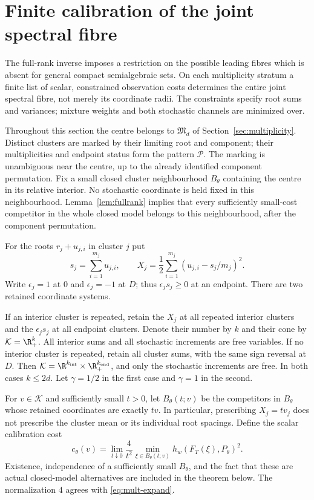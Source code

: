 \section{Finite calibration of the joint spectral fibre}\label{sec:v101-finite}
The full-rank inverse imposes a restriction on the possible leading
fibres which is absent for general compact semialgebraic sets. On each
multiplicity stratum a finite list of scalar, constrained observation
costs determines the entire joint spectral fibre, not merely its
coordinate radii. The constraints specify root sums and variances;
mixture weights and both stochastic channels are minimized over.

Throughout this section the centre belongs to $\mathfrak M_d$ of
Section~\ref{sec:multiplicity}. Distinct clusters are marked by their
limiting root and component; their multiplicities and endpoint status
form the pattern $\mathcal P$. The marking is unambiguous near the
centre, up to the already identified component permutation. Fix a small
closed cluster neighbourhood $B_\theta$ containing the centre in its
relative interior. No stochastic coordinate is held fixed in this
neighbourhood. Lemma~\ref{lem:fullrank} implies that every sufficiently
small-cost competitor in the whole closed model belongs to this
neighbourhood, after the component permutation.

For the roots $r_j+u_{j,i}$ in cluster $j$ put
\[
 s_j=\sum_{i=1}^{m_j}u_{j,i},\qquad
 X_j=\frac12\sum_{i=1}^{m_j}(u_{j,i}-s_j/m_j)^2.
\]
Write $\epsilon_j=1$ at $0$ and $\epsilon_j=-1$ at $D$; thus
$\epsilon_j s_j\ge0$ at an endpoint. There are two retained coordinate
systems.

If an interior cluster is repeated, retain the $X_j$ at all repeated
interior clusters and the $\epsilon_j s_j$ at all endpoint clusters.
Denote their number by $k$ and their cone by $\mathcal K=\R_+^k$.
All interior sums and all stochastic increments are free variables.
If no interior cluster is repeated, retain all cluster sums, with the
same sign reversal at $D$. Then
$\mathcal K=\R^{k_{\mathrm{int}}}\times\R_+^{k_{\mathrm{end}}}$,
and only the stochastic increments are free. In both cases $k\le2d$.
Let $\gamma=1/2$ in the first case and $\gamma=1$ in the second.

For $v\in\mathcal K$ and sufficiently small $t>0$, let
$B_\theta(t;v)$ be the competitors in $B_\theta$ whose retained
coordinates are exactly $tv$. In particular, prescribing $X_j=t v_j$
does not prescribe the cluster mean or its individual root spacings.
Define the scalar calibration cost
\begin{equation}\label{eq:v101-calibration}
 c_\theta(v)=\lim_{t\downarrow0}\frac4{t^2}
       \min_{\xi\in B_\theta(t;v)}h_w(F_T(\xi),P_\theta)^2.
\end{equation}
Existence, independence of a sufficiently small $B_\theta$, and the
fact that these are actual closed-model alternatives are included in
the theorem below. The normalization $4$ agrees with
\eqref{eq:mult-expand}.

